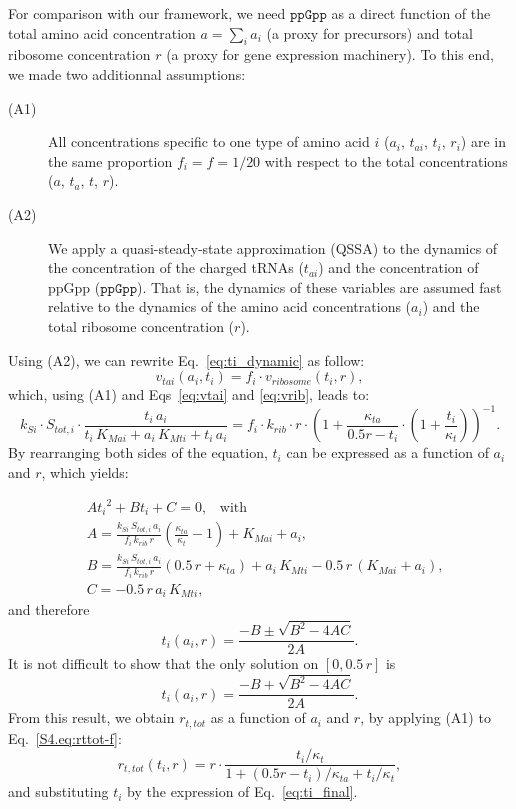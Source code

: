 For comparison with our framework, we need $\texttt{ppGpp}$ as a direct function of the total amino acid concentration $a = \sum_i a_i$ (a proxy for precursors) and total ribosome concentration $r$ (a proxy for gene expression machinery).
To this end, we made two additionnal assumptions:
\begin{description}
\item[(A1)] All concentrations specific to one type of amino acid $i$ ($a_i$, $t_{ai}$, $t_{i}$, $r_i$) are in the same proportion $f_i = f = 1/20$ with respect to the total concentrations ($a$, $t_{a}$, $t$, $r$).
\item[(A2)] We apply a quasi-steady-state approximation (QSSA) to the dynamics of the concentration of the charged tRNAs ($t_{ai}$) and the concentration of ppGpp ($\texttt{ppGpp}$).
That is, the dynamics of these variables are assumed fast relative to the dynamics of the amino acid concentrations ($a_i$) and the total ribosome concentration ($r$).
\end{description}
Using (A2), we can rewrite Eq.~\ref{eq:ti_dynamic} as follow:
\begin{equation}\label{eq:vtai_vrib}
v_{tai}(a_i, t_{i}) = f_i \cdot v_{ribosome}(t_i,r),
\end{equation}
which, using (A1) and Eqs~\ref{eq:vtai} and \ref{eq:vrib}, leads to:
\begin{equation}
\label{eq:vtai_vrib_without_sum}
k_{Si} \cdot S_{tot,i} \cdot \frac{t_i\, a_i}{t_i\, K_{Mai} + a_i\, K_{Mti} + t_i\, a_i}
= f_i \cdot k_{rib} \cdot r \cdot
  \left(1 + \frac{\kappa_{ta}}{0.5 r - t_i} \cdot \left( 1 + \frac{t_i}{\kappa_t} \right)  \right)^{-1}.
\end{equation}
By rearranging both sides of the equation, $t_i$ can be expressed as a function of $a_i$ and $r$, which yields:

\begin{equation}
\begin{alignedat}{2}
&A {t_i}^2 + B t_i + C = 0, \;\;\; \text{with}\\
&A = \frac{k_{Si} \,S_{tot,i} \,a_i}{f_i\, k_{rib} \,r} \left( \frac{\kappa_{ta}}{\kappa_t} - 1\right) + K_{Mai} + a_i,\\
&B = \frac{k_{Si} \,S_{tot,i} \,a_i}{f_i \,k_{rib} \,r} (0.5\,r+\kappa_{ta}) + a_i \,K_{Mti} - 0.5\,r\,(K_{Mai} + a_i),\\
&C = - 0.5 \,r \,a_i \,K_{Mti},
\end{alignedat}
\end{equation}
and therefore
\[
t_i (a_i, r) = \frac{-B \pm \sqrt{B^2 - 4AC}}{2A}.
\]
It is not difficult to show that the only solution on $[0, 0.5\,r]$ is
\begin{equation}
\label{eq:ti_final}
t_i (a_i, r) = \frac{-B + \sqrt{B^2 - 4AC}}{2A}.
\end{equation}
From this result, we obtain $r_{t,tot}$ as a function of $a_i$ and $r$, by applying (A1) to Eq.~\ref{S4.eq:rttot-f}:
\begin{equation}
\label{eq:rttot-f_without_sum}
r_{t,tot}(t_i, r) = r \cdot \frac{t_i/\kappa_{t}}{1+(0.5 r-t_i)/\kappa_{ta}+t_i/\kappa_{t}},
\end{equation}
and substituting $t_i$ by the expression of Eq.~\ref{eq:ti_final}.

